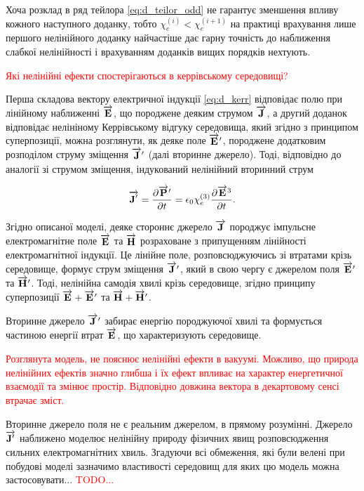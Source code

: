 Хоча розклад в ряд тейлора \eqref{eq:d_teilor_odd} не гарантує зменшення 
впливу кожного наступного доданку, тобто $ \chi_e^{(i)} < \chi_e^{(i+1)} $
на практиці врахування лише першого нелінійного доданку найчастіше дає
гарну точність до наближення слабкої нелінійності і врахуванням доданків
вищих порядків нехтують.

\textcolor{red}{ Які нелінійні ефекти спостерігаються в 
керрівському середовищі?}

Перша складова вектору електричної індукції \eqref{eq:d_kerr} відповідає 
полю при лінійному наближенні $ \overrightarrow{\mathbf E} $, що породжене деяким 
струмом $ \overrightarrow{\mathbf J} $, а другий доданок відповідає нелініному Керрівському 
відгуку середовища, який згідно з принципом суперпозиції, можна розглянути, 
як деяке поле $ \overrightarrow{\mathbf E}^\prime $, породжене додатковим розподілом струму 
зміщення $ \overrightarrow{\mathbf J}^\prime $ (далі вторинне джерело). Тоді, відповідно до
аналогії зі струмом зміщення, індукований нелінійний вторинний струм

\begin{equation} \label{eq:j_kerr}
\overrightarrow{\mathbf J^\prime} = \frac{\partial \overrightarrow{\mathbf P}^\prime}{\partial t} = 
\epsilon_0 \chi_e^{(3)} \frac{\partial \overrightarrow{\mathbf E}^3}{\partial t}.
\end{equation}

Згідно описаної моделі, деяке стороннє джерело $ \overrightarrow{\mathbf J} $ породжує 
імпульсне електромагнітне поле $ \overrightarrow{\mathbf E} $ та $ \overrightarrow{\mathbf H} $ розраховане
з припущенням лінійності електромагнітної індукції. Це лінійне поле, 
розповсюджуючись зі втратами крізь середовище, формує струм зміщення 
$ \overrightarrow{\mathbf J}^\prime $, який в свою чергу є джерелом поля $ \overrightarrow{\mathbf E}^\prime $ 
та $ \overrightarrow{\mathbf H}^\prime $. Тоді, нелінійна самодія хвилі крізь середовище, 
згідно принципу суперпозиції $ \overrightarrow{\mathbf E} + \overrightarrow{\mathbf E}^\prime $ та 
$ \overrightarrow{\mathbf H} + \overrightarrow{\mathbf H}^\prime $.

Вторинне джерело $ \overrightarrow{\mathbf J}^\prime $ забирає енергію породжуючої хвилі та 
формується частиною енергії втрат $ \overrightarrow{\mathbf E} $, що характеризують середовище.

\textcolor{red}{ Розглянута модель, не пояснює нелінійні ефекти в вакуумі. 
Можливо, що природа нелінійних ефектів значно глибша і їх ефект впливає на 
характер енергетичної взаємодії та змінює простір. Відповідно довжина вектора 
в декартовому сенсі втрачає зміст. }

Вторинне джерело поля не є реальним джерелом, в прямому розумінні. 
Джерело $ \overrightarrow{\mathbf J^\prime} $ наближено моделює нелінійну природу фізичних 
явищ розповсюдження сильних електромагнітних хвиль. Згадуючи всі обмеження,
які були велені при побудові моделі зазначимо властивості середовищ для 
яких цю модель можна застосовувати... \textcolor{red}{TODO...}

